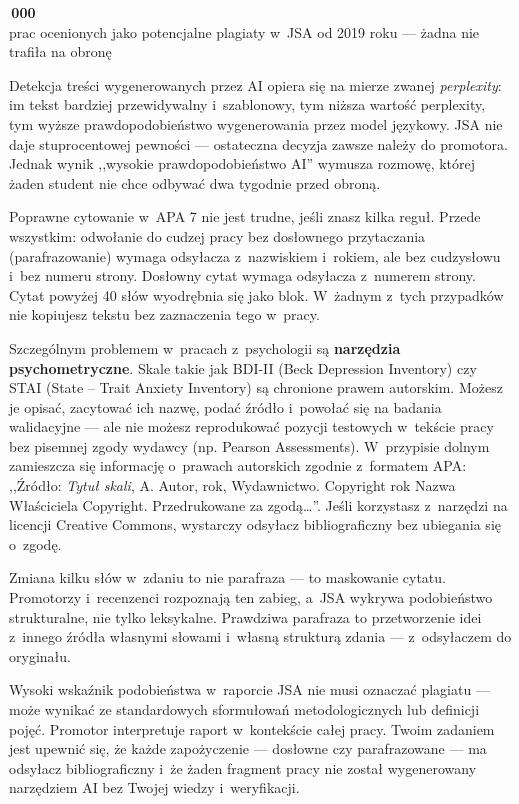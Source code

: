 \documentclass[12pt,a4paper,twoside,openany]{book}
\newcommand{\bignumber}[2]{%
  \par\vspace{8pt}\noindent\begin{minipage}{\linewidth}\centering
  {\headingfont\bfseries\color{accent}\fontsize{40}{44}\selectfont #1}\\[3pt]
  {\sffamily\small\color{sectioncolor}#2}
  \end{minipage}\vspace{6pt}\par
}
\begin{document}
\bignumber{320\,000}{prac ocenionych jako potencjalne plagiaty w~JSA od 2019 roku --- żadna nie trafiła na obronę}

Detekcja treści wygenerowanych przez AI opiera się na mierze zwanej \emph{perplexity}: im tekst bardziej przewidywalny i~szablonowy, tym niższa wartość perplexity, tym wyższe prawdopodobieństwo wygenerowania przez model językowy. JSA nie daje stuprocentowej pewności --- ostateczna decyzja zawsze należy do promotora. Jednak wynik ,,wysokie prawdopodobieństwo AI'' wymusza rozmowę, której żaden student nie chce odbywać dwa tygodnie przed obroną.

Poprawne cytowanie w~APA 7 nie jest trudne, jeśli znasz kilka reguł. Przede wszystkim: odwołanie do cudzej pracy bez dosłownego przytaczania (parafrazowanie) wymaga odsyłacza z~nazwiskiem i~rokiem, ale bez cudzysłowu i~bez numeru strony. Dosłowny cytat wymaga odsyłacza z~numerem strony. Cytat powyżej 40 słów wyodrębnia się jako blok. W~żadnym z~tych przypadków nie kopiujesz tekstu bez zaznaczenia tego w~pracy.

Szczególnym problemem w~pracach z~psychologii są \textbf{narzędzia psychometryczne}. Skale takie jak BDI-II (Beck Depression Inventory) czy STAI (State -- Trait Anxiety Inventory) są chronione prawem autorskim. Możesz je opisać, zacytować ich nazwę, podać źródło i~powołać się na badania walidacyjne --- ale nie możesz reprodukować pozycji testowych w~tekście pracy bez pisemnej zgody wydawcy (np. Pearson Assessments). W~przypisie dolnym zamieszcza się informację o~prawach autorskich zgodnie z~formatem APA: ,,Źródło: \emph{Tytuł skali}, A. Autor, rok, Wydawnictwo. Copyright rok Nazwa Właściciela Copyright. Przedrukowane za zgodą\ldots''. Jeśli korzystasz z~narzędzi na licencji Creative Commons, wystarczy odsyłacz bibliograficzny bez ubiegania się o~zgodę.

\begin{warningbox}
Zmiana kilku słów w~zdaniu to nie parafraza --- to maskowanie cytatu. Promotorzy i~recenzenci rozpoznają ten zabieg, a~JSA wykrywa podobieństwo strukturalne, nie tylko leksykalne. Prawdziwa parafraza to przetworzenie idei z~innego źródła własnymi słowami i~własną strukturą zdania --- z~odsyłaczem do oryginału.
\end{warningbox}

\begin{keyinsight}
Wysoki wskaźnik podobieństwa w~raporcie JSA nie musi oznaczać plagiatu --- może wynikać ze standardowych sformułowań metodologicznych lub definicji pojęć. Promotor interpretuje raport w~kontekście całej pracy. Twoim zadaniem jest upewnić się, że każde zapożyczenie --- dosłowne czy parafrazowane --- ma odsyłacz bibliograficzny i~że żaden fragment pracy nie został wygenerowany narzędziem AI bez Twojej wiedzy i~weryfikacji.
\end{keyinsight}
\end{document}
